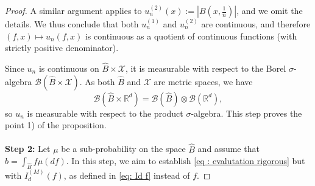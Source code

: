 \documentclass[a4paper, 11pt]{article}
\theoremstyle{definition}
\newcommand{\cX}{{\mathcal{X}}}
\begin{document}
{\begin{proof}
	A similar argument applies to \( u_n^{(2)}(x) := |B(x, \frac{1}{n})| \), and we omit the details. We thus conclude that both \( u_n^{(1)} \) and \( u_n^{(2)} \) are continuous, and therefore \( (f,x)\mapsto u_n(f,x) \) is continuous as a quotient of continuous functions (with strictly positive denominator).
	
	Since \( u_n \) is continuous on \( \widehat{B} \times \cX \), it is measurable with respect to the Borel \( \sigma \)-algebra \( \mathcal{B}(\widehat{B} \times \cX) \). As both \( \widehat{B} \) and \( \cX \) are metric spaces, we have
	\[
	\mathcal{B}(\widehat{B} \times \mathbb{R}^d) = \mathcal{B}(\widehat{B}) \otimes \mathcal{B}(\mathbb{R}^d),
	\]
	so \( u_n \) is measurable with respect to the product \( \sigma \)-algebra. 
	This step proves the point 1) of the proposition.
	\\
	\\
	\textbf{Step 2:}  Let $\mu$ be a sub-probability on the space $\widehat{B}$ and assume that $b=\int_{\widehat{B}} f \mu(df)$. 	
	In this step, we aim to establish \eqref{eq : evalutation rigorous} but with $I_d^{(M)}(f)$, as defined in \eqref{eq: Id f} instead of $f$. 
	

\end{proof}}
\end{document}
